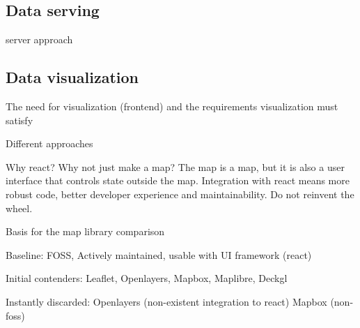 \subsection{Data serving}
server approach





\subsection{Data visualization}

The need for visualization (frontend) and the requirements visualization must satisfy

Different approaches

Why react? Why not just make a map?
The map is a map, but it is also a user interface that controls state outside the map.
Integration with react means more robust code, better developer experience and maintainability.
Do not reinvent the wheel.

Basis for the map library comparison

Baseline: FOSS, Actively maintained, usable with UI framework (react)

Initial contenders: Leaflet, Openlayers, Mapbox, Maplibre, Deckgl

Instantly discarded: Openlayers (non-existent integration to react) Mapbox (non-foss)








